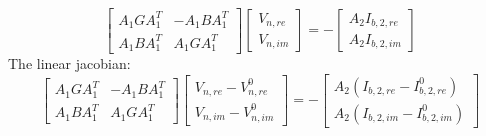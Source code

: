\documentclass{book}
\begin{document}
\begin{equation}
\begin{bmatrix}
A_1GA_1^{T}&-A_1BA_1^{T}\\
A_1BA_1^{T}&A_1GA_1^{T}
\end{bmatrix}
\begin{bmatrix}
V_{n,re}\\
V_{n,im}
\end{bmatrix}
=-
\begin{bmatrix}
A_2I_{b,2,re}\\
A_2I_{b,2,im}
\end{bmatrix}
\end{equation}
The linear jacobian:
\begin{equation}
\begin{bmatrix}
A_1GA_1^{T}&-A_1BA_1^{T}\\
A_1BA_1^{T}&A_1GA_1^{T}
\end{bmatrix}
\begin{bmatrix}
V_{n,re}-V_{n,re}^{0}\\
V_{n,im}-V_{n,im}^{0}
\end{bmatrix}
=-
\begin{bmatrix}
A_2(I_{b,2,re}-I_{b,2,re}^{0})\\
A_2(I_{b,2,im}-I_{b,2,im}^{0})
\end{bmatrix}
\end{equation}
\end{document}
